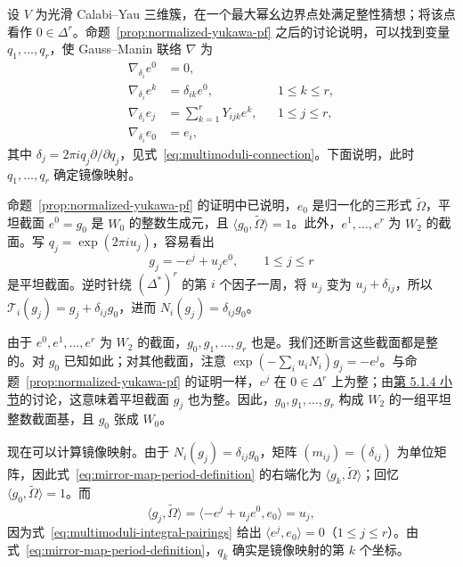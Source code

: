 \begin{example}\label{ex:mirror-map-integral-connection}
设 $V$ 为光滑 Calabi--Yau 三维簇，在一个最大幂幺边界点处满足整性猜想；将该点看作 $0\in\Delta^r$。命题~\ref{prop:normalized-yukawa-pf} 之后的讨论说明，可以找到变量 $q_1,\ldots,q_r$，使 Gauss--Manin 联络 $\nabla$ 为
\begin{equation}\label{eq:mirror-map-flat-connection}
\begin{aligned}
\nabla_{\delta_i}e^0&=0,\\
\nabla_{\delta_i}e^k&=\delta_{ik}e^0,&&1\leq k\leq r,\\
\nabla_{\delta_i}e_j&=\sum_{k=1}^rY_{ijk}e^k,&&1\leq j\leq r,\\
\nabla_{\delta_i}e_0&=e_i,
\end{aligned}
\end{equation}
其中 $\delta_j=2\pi iq_j\partial/\partial q_j$，见式~\eqref{eq:multimoduli-connection}。下面说明，此时 $q_1,\ldots,q_r$ 确定镜像映射。

命题~\ref{prop:normalized-yukawa-pf} 的证明中已说明，$e_0$ 是归一化的三形式 $\widetilde\Omega$，平坦截面 $e^0=g_0$ 是 $W_0$ 的整数生成元，且 $\langle g_0,\widetilde\Omega\rangle=1$。此外，$e^1,\ldots,e^r$ 为 $W_2$ 的截面。写 $q_j=\exp(2\pi iu_j)$，容易看出
\[
g_j=-e^j+u_je^0,\qquad1\leq j\leq r
\]
是平坦截面。逆时针绕 $(\Delta^*)^r$ 的第 $i$ 个因子一周，将 $u_j$ 变为 $u_j+\delta_{ij}$，所以 $\mathcal T_i(g_j)=g_j+\delta_{ij}g_0$，进而 $N_i(g_j)=\delta_{ij}g_0$。

由于 $e^0,e^1,\ldots,e^r$ 为 $W_2$ 的截面，$g_0,g_1,\ldots,g_r$ 也是。我们还断言这些截面都是整的。对 $g_0$ 已知如此；对其他截面，注意
$\exp(-\sum_i u_iN_i)g_j=-e^j$。与命题~\ref{prop:normalized-yukawa-pf} 的证明一样，$e^j$ 在 $0\in\Delta^r$ 上为整；由\hyperref[subsec:limiting-hodge]{第 5.1.4 小节}的讨论，这意味着平坦截面 $g_j$ 也为整。因此，$g_0,g_1,\ldots,g_r$ 构成 $W_2$ 的一组平坦整数截面基，且 $g_0$ 张成 $W_0$。

现在可以计算镜像映射。由于 $N_i(g_j)=\delta_{ij}g_0$，矩阵 $(m_{ij})=(\delta_{ij})$ 为单位矩阵，因此式~\eqref{eq:mirror-map-period-definition} 的右端化为 $\langle g_k,\widetilde\Omega\rangle$；回忆 $\langle g_0,\widetilde\Omega\rangle=1$。而
\[
\langle g_j,\widetilde\Omega\rangle
=\langle-e^j+u_je^0,e_0\rangle=u_j,
\]
因为式~\eqref{eq:multimoduli-integral-pairings} 给出 $\langle e^j,e_0\rangle=0$（$1\leq j\leq r$）。由式~\eqref{eq:mirror-map-period-definition}，$q_k$ 确实是镜像映射的第 $k$ 个坐标。
\end{example}

